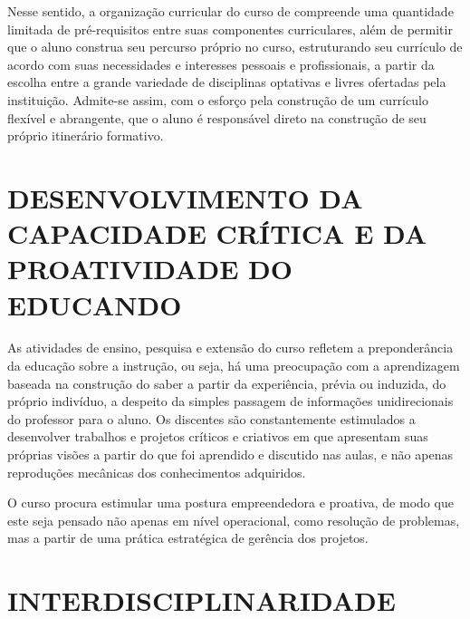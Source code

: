 Nesse sentido, a organização curricular do curso de \nomedocurso compreende uma quantidade limitada de pré-requisitos entre suas componentes curriculares, além de permitir que o aluno construa seu percurso próprio no curso, estruturando seu currículo de acordo com suas necessidades e interesses pessoais e profissionais, a partir da escolha entre a grande variedade de disciplinas optativas e livres ofertadas pela instituição. Admite-se assim, com o esforço pela construção de um currículo flexível e abrangente, que o aluno é responsável direto na construção de seu próprio itinerário formativo.

\section{DESENVOLVIMENTO DA CAPACIDADE CRÍTICA E DA PROATIVIDADE DO EDUCANDO}

As atividades de ensino, pesquisa e extensão do curso refletem a preponderância da educação sobre a instrução, ou seja, há uma preocupação com a aprendizagem baseada na construção do saber a partir da experiência, prévia ou induzida, do próprio indivíduo, a despeito da simples passagem de informações unidirecionais do professor para o aluno. Os discentes são constantemente estimulados a desenvolver trabalhos e projetos críticos e criativos em que apresentam suas próprias visões a partir do que foi aprendido e discutido nas aulas, e não apenas reproduções mecânicas dos conhecimentos adquiridos.

O curso procura estimular uma postura empreendedora e proativa, de modo que este seja pensado não apenas em nível operacional, como resolução de problemas, mas a partir de uma prática estratégica de gerência dos projetos. %
%

\section{INTERDISCIPLINARIDADE}

